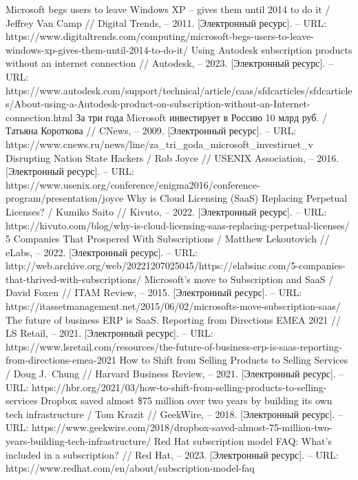 \documentclass{article}
\begin{document}
\begin{thebibliography}{2}
 Microsoft begs users to leave Windows XP – gives them until 2014 to do it / Jeffrey Van Camp // Digital Trends, – 2011. [Электронный ресурс]. – URL: https://www.digitaltrends.com/computing/microsoft-begs-users-to-leave-windows-xp-gives-them-until-2014-to-do-it/
 Using Autodesk subscription products without an internet connection // Autodesk, – 2023. [Электронный ресурс]. – URL: https://www.autodesk.com/support/technical/article/caas/sfdcarticles/sfdcarticles/About-using-a-Autodesk-product-on-subscription-without-an-Internet-connection.html
 За три года Microsoft инвестирует в Россию 10 млрд руб. / Татьяна Короткова // CNews, – 2009. [Электронный ресурс]. – URL: https://www.cnews.ru/news/line/za\_tri\_goda\_microsoft\_investiruet\_v
 Disrupting Nation State Hackers / Rob Joyce // USENIX Association, – 2016. [Электронный ресурс]. – URL: https://www.usenix.org/conference/enigma2016/conference-program/presentation/joyce
 Why is Cloud Licensing (SaaS) Replacing Perpetual Licenses? / Kumiko Saito // Kivuto, – 2022. [Электронный ресурс]. – URL: https://kivuto.com/blog/why-is-cloud-licensing-saas-replacing-perpetual-licenses/
 5 Companies That Prospered With Subscriptions / Matthew Lekoutovich // eLabs, – 2022. [Электронный ресурс]. – URL: http://web.archive.org/web/20221207025045/https://elabsinc.com/5-companies-that-thrived-with-subscriptions/
 Microsoft's move to Subscription and SaaS / David Foxen // ITAM Review, – 2015. [Электронный ресурс]. – URL: https://itassetmanagement.net/2015/06/02/microsofts-move-subscription-saas/
 The future of business ERP is SaaS. Reporting from Directions EMEA 2021 // LS Retail, – 2021. [Электронный ресурс]. – URL: https://www.lsretail.com/resources/the-future-of-business-erp-is-saas-reporting-from-directions-emea-2021
 How to Shift from Selling Products to Selling Services / Doug J.~Chung // Harvard Business Review, – 2021. [Электронный ресурс]. – URL: https://hbr.org/2021/03/how-to-shift-from-selling-products-to-selling-services
 Dropbox saved almost \$75 million over two years by building its own tech infrastructure / Tom Krazit // GeekWire, – 2018. [Электронный ресурс]. – URL: https://www.geekwire.com/2018/dropbox-saved-almost-75-million-two-years-building-tech-infrastructure/
 Red Hat subscription model FAQ: What's included in a subscription? // Red Hat, – 2023. [Электронный ресурс]. – URL: https://www.redhat.com/en/about/subscription-model-faq

\end{thebibliography}
\end{document}
